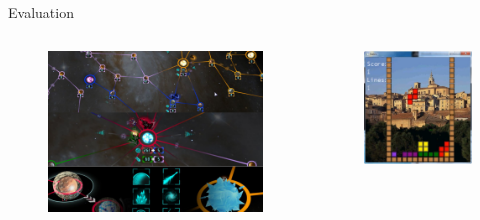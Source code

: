 \documentclass{beamer}
\begin{document}
\begin{frame}[fragile]{Evaluation}
\begin{columns}[c]
\column{1.5in}
\begin{figure}
\includegraphics[scale=0.1]{Pics/galaxy_wars.png}
\end{figure}
\begin{figure}
\includegraphics[scale=0.15]{Pics/tetris.jpg}
\end{figure}


\end{columns}
\end{frame}
\end{document}
